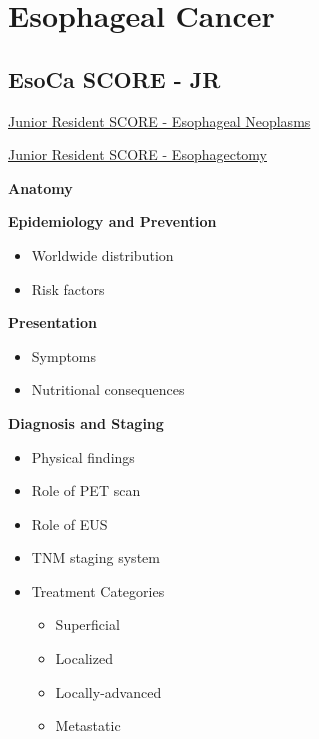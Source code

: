 \documentclass[
]{book}
\providecommand{\tightlist}{%
  \setlength{\itemsep}{0pt}\setlength{\parskip}{0pt}}
\begin{document}
\hypertarget{part-esophageal-cancer}{%
\part*{Esophageal Cancer}\label{part-esophageal-cancer}}

\hypertarget{EsoObjJB}{%
\chapter{EsoCa SCORE - JR}\label{EsoObjJB}}

\href{https://www.surgicalcore.org/modulecontent.aspx?id=1000534}{Junior Resident SCORE - Esophageal Neoplasms}

\href{https://www.surgicalcore.org/modulecontent.aspx?id=164703}{Junior Resident SCORE - Esophagectomy}

\textbf{Anatomy}

\textbf{Epidemiology and Prevention}

\begin{itemize}
\tightlist
\item
  Worldwide distribution
\item
  Risk factors
\end{itemize}

\textbf{Presentation}

\begin{itemize}
\tightlist
\item
  Symptoms
\item
  Nutritional consequences
\end{itemize}

\textbf{Diagnosis and Staging}

\begin{itemize}
\tightlist
\item
  Physical findings
\item
  Role of PET scan
\item
  Role of EUS
\item
  TNM staging system
\item
  Treatment Categories

  \begin{itemize}
  \tightlist
  \item
    Superficial
  \item
    Localized
  \item
    Locally-advanced
  \item
    Metastatic
  \end{itemize}
\end{itemize}
\end{document}
